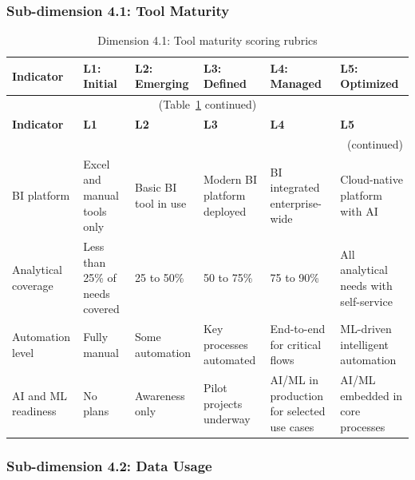 \subsubsection*{Sub-dimension 4.1: Tool Maturity}

\begin{center}
{\small
\begin{longtable}{|p{2.4cm}|p{2.0cm}|p{2.0cm}|p{2.2cm}|p{2.2cm}|p{2.2cm}|}
\caption{Dimension 4.1: Tool maturity scoring rubrics}\label{tab:d4-1}\\

\hline
\textbf{Indicator} & \textbf{L1: Initial} & \textbf{L2: Emerging} & \textbf{L3: Defined} & \textbf{L4: Managed} & \textbf{L5: Optimized} \\
\hline
\endfirsthead
\multicolumn{6}{c}{\small (Table~\ref{tab:d4-1} continued)} \\
\hline
\textbf{Indicator} & \textbf{L1} & \textbf{L2} & \textbf{L3} & \textbf{L4} & \textbf{L5} \\
\hline
\endhead
\hline
\multicolumn{6}{r}{\small (continued)} \\
\endfoot
\hline
\endlastfoot
BI platform &
  Excel and manual tools only &
  Basic BI tool in use &
  Modern BI platform deployed &
  BI integrated enterprise-wide &
  Cloud-native platform with AI \\
\hline
Analytical coverage &
  Less than 25\% of needs covered &
  25 to 50\% &
  50 to 75\% &
  75 to 90\% &
  All analytical needs with self-service \\
\hline
Automation level &
  Fully manual &
  Some automation &
  Key processes automated &
  End-to-end for critical flows &
  ML-driven intelligent automation \\
\hline
AI and ML readiness &
  No plans &
  Awareness only &
  Pilot projects underway &
  AI/ML in production for selected use cases &
  AI/ML embedded in core processes \\
\hline
\end{longtable}
}
\end{center}

\subsubsection*{Sub-dimension 4.2: Data Usage}

